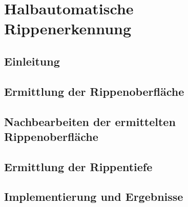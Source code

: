 \chapter{Halbautomatische Rippenerkennung}
\label{cha:segment}
	
\section{Einleitung}

\section{Ermittlung der Rippenoberfl\"ache}

\section{Nachbearbeiten der ermittelten Rippenoberfl\"ache}

\section{Ermittlung der Rippentiefe}

\section{Implementierung und Ergebnisse}

